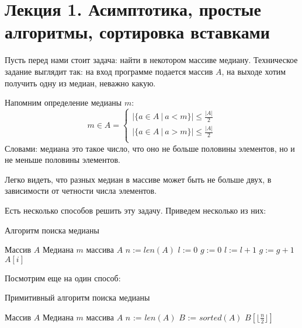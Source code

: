 \documentclass[../book.tex]{subfiles}
\begin{document}
	\section{Лекция 1. Асимптотика, простые алгоритмы, сортировка вставками}
	
	Пусть перед нами стоит задача: найти в некотором массиве медиану. Техническое задание выглядит так: на вход программе подается массив $A$, на выходе хотим получить одну из медиан, неважно какую.
	
	Напомним определение медианы $m$:
	\[
	m \in A = 
	\begin{cases}
		|\{ a \in A \ | \ a < m \}| \leqslant \frac{|A|}{2} \\
		|\{ a \in A \ | \ a > m \}| \leqslant \frac{|A|}{2} \\
	\end{cases}
	\]
	Словами: медиана это такое число, что оно не больше половины элементов, но и не меньше половины элементов.
	
	Легко видеть, что разных медиан в массиве может быть не больше двух, в зависимости от четности числа элементов.
	
	Есть несколько способов решить эту задачу. Приведем несколько из них:
	\begin{algorithm}[H]
		\caption{Алгоритм поиска медианы}
		\begin{algorithmic}[1]
			\Require Массив $A$
			\Ensure Медиана $m$ массива $A$
				\State $n := len(A)$
					\State $l := 0$
					\State $g := 0$
							\State $l := l + 1$
							\State $g := g + 1$
						\EndIf
					\EndFor
					\State \Return $A[i]$
				\EndIf
				\EndFor
			\EndFunction
		\end{algorithmic}
	\end{algorithm}
	

	
	Посмотрим еще на один способ:
	
	\begin{algorithm}[H]
		\caption{Примитивный алгоритм поиска медианы}
		\begin{algorithmic}[1]
			\Require Массив $A$
			\Ensure Медиана $m$ массива $A$
				\State $n$ := $len(A)$
				\State $B$ := $sorted(A)$
				\State \Return $B[\lfloor\frac{n}{2}\rfloor]$
			\EndFunction
		\end{algorithmic}
	\end{algorithm}
	
\end{document}
